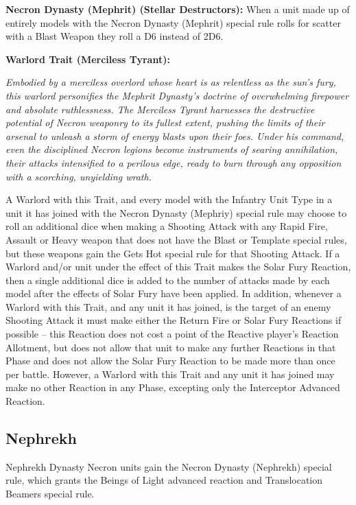 \begin{multicols}{2}
\textbf{Necron Dynasty (Mephrit) (Stellar Destructors):}  When a unit made up of entirely models with the Necron Dynasty (Mephrit) special rule rolls for scatter with a Blast Weapon they roll a D6 instead of 2D6.

\textbf{Warlord Trait (Merciless Tyrant):}

\textit{Embodied by a merciless overlord whose heart is as relentless as the sun's fury, this warlord personifies the Mephrit Dynasty’s doctrine of overwhelming firepower and absolute ruthlessness. The Merciless Tyrant harnesses the destructive potential of Necron weaponry to its fullest extent, pushing the limits of their arsenal to unleash a storm of energy blasts upon their foes. Under his command, even the disciplined Necron legions become instruments of searing annihilation, their attacks intensified to a perilous edge, ready to burn through any opposition with a scorching, unyielding wrath.}

A Warlord with this Trait, and every model with the Infantry Unit Type in a unit it has joined with the Necron Dynasty (Mephriy) special rule may choose to roll an additional dice when making a Shooting Attack with any Rapid Fire, Assault or Heavy weapon that does not have the Blast or Template special rules, but these weapons gain the Gets Hot special rule for that Shooting Attack. If a Warlord and/or unit under the effect of this Trait makes the Solar Fury Reaction, then a single additional dice is added to the number of attacks made by each model after the effects of Solar Fury have been applied. In addition, whenever a Warlord with this Trait, and any unit it has joined, is the target of an enemy Shooting Attack it must make either the Return Fire or Solar Fury Reactions if possible – this Reaction does not cost a point of the Reactive player’s Reaction Allotment, but does not allow that unit to make any further Reactions in that Phase and does not allow the Solar Fury Reaction to be made more than once per battle. However, a Warlord with this Trait and any unit it has joined may make no other Reaction in any Phase, excepting only the Interceptor Advanced Reaction.


\newpage
\subsection{Nephrekh}

Nephrekh Dynasty Necron units gain the Necron Dynasty (Nephrekh) special rule, which grants the Beings of Light advanced reaction and Translocation Beamers special rule.


\end{multicols}
